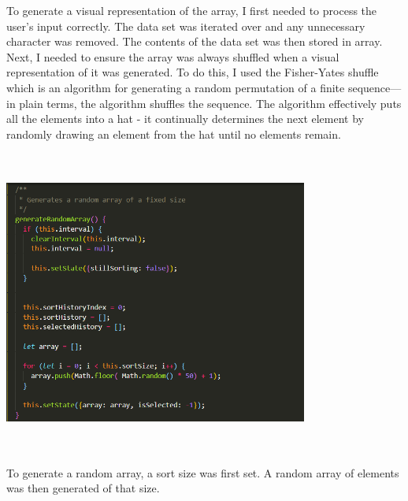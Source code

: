 To generate a visual representation of the array, I first needed to process the user's input correctly. The data set was iterated over and any unnecessary character was removed. The contents of the data set was then stored in array. Next, I needed to ensure the array was always shuffled when a visual representation of it was generated. To do this, I used the Fisher-Yates shuffle which is an algorithm for generating a random permutation of a finite sequence—in plain terms, the algorithm shuffles the sequence. The algorithm effectively puts all the elements into a hat - it continually determines the next element by randomly drawing an element from the hat until no elements remain.
\par
\bigskip
\begin{center}
    \includegraphics[width=10cm,height=10cm,keepaspectratio]{images/mainpage4}
\end{center}
To generate a random array, a sort size was first set. A random array of elements was then generated of that size.

